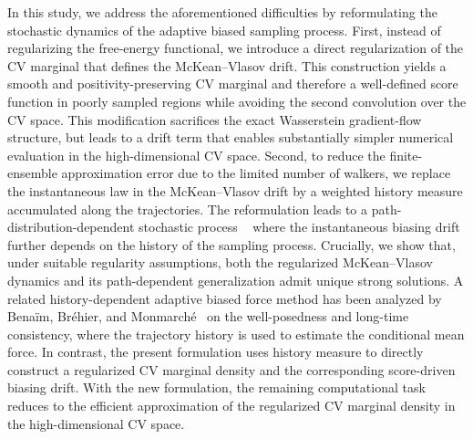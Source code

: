 \documentclass[a4paper,fleqn]{cas-sc}
\theoremstyle{definition}
\begin{document}
In this study, we address the aforementioned difficulties by reformulating the stochastic dynamics of the adaptive biased sampling process. 
First, instead of regularizing the free-energy functional, we introduce a direct regularization of the CV marginal that defines the McKean--Vlasov drift. 
This construction yields a smooth and positivity-preserving CV marginal and therefore a well-defined score function in poorly sampled regions while avoiding the second convolution over the CV space. 
This modification sacrifices the exact Wasserstein gradient-flow structure, but leads to a drift term that enables substantially simpler numerical evaluation in the high-dimensional CV space. 
Second, to reduce the finite-ensemble approximation error due to the limited number of walkers, we replace the instantaneous law in the McKean--Vlasov drift by a weighted history measure accumulated along the trajectories. 
%
The reformulation leads to a path-distribution-dependent stochastic process ~\cite{wang2018distribution}  where the instantaneous biasing drift further depends on the history of the sampling process. 
%
Crucially, we show that, under suitable regularity assumptions, both the regularized McKean--Vlasov dynamics and its path-dependent generalization admit unique strong solutions. 
A related history-dependent adaptive biased force method has been analyzed by Bena\"im, Br\'ehier, and Monmarch\'e~\cite{benaim2020abf_self_interacting} on the well-posedness and long-time consistency, where the trajectory history is used to estimate the conditional mean force.
In contrast, the present formulation uses history measure to directly construct a regularized CV marginal density and the corresponding score-driven biasing drift.
%
With the new formulation, the remaining computational task reduces to the efficient approximation of the regularized CV marginal density in the high-dimensional CV space.  
\end{document}
